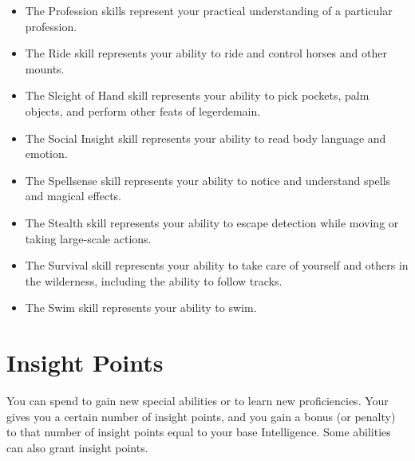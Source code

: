 \begin{itemize}
        \item The Profession skills represent your practical understanding of a particular profession.
        \item The Ride skill represents your ability to ride and control horses and other mounts.
        \item The Sleight of Hand skill represents your ability to pick pockets, palm objects, and perform other feats of legerdemain.
        \item The Social Insight skill represents your ability to read body language and emotion.
        \item The Spellsense skill represents your ability to notice and understand spells and magical effects.
        \item The Stealth skill represents your ability to escape detection while moving or taking large-scale actions.
        \item The Survival skill represents your ability to take care of yourself and others in the wilderness, including the ability to follow tracks.
        \item The Swim skill represents your ability to swim.
    \end{itemize}

\section{Insight Points}\label{Insight Points}
    You can spend  to gain new special abilities or to learn new proficiencies.
    Your  gives you a certain number of insight points, and you gain a bonus (or penalty) to that number of insight points equal to your base Intelligence.
    Some abilities can also grant insight points.

